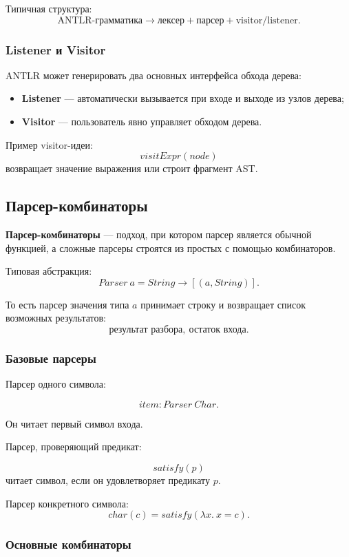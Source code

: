 \documentclass[12pt,a4paper]{article}
\theoremstyle{definition}
\theoremstyle{plain}
\begin{document}
Типичная структура:
\[
\text{ANTLR-грамматика}
\to
\text{лексер}
+
\text{парсер}
+
\text{visitor/listener}.
\]

\subsubsection*{Listener и Visitor}

ANTLR может генерировать два основных интерфейса обхода дерева:

\begin{itemize}
    \item \textbf{Listener} --- автоматически вызывается при входе и выходе из узлов дерева;
    \item \textbf{Visitor} --- пользователь явно управляет обходом дерева.
\end{itemize}

Пример visitor-идеи:
\[
visitExpr(node)
\]
возвращает значение выражения или строит фрагмент AST.

\subsection{Парсер-комбинаторы}

\textbf{Парсер-комбинаторы} --- подход, при котором парсер является обычной функцией, а сложные парсеры строятся из простых с помощью комбинаторов.

Типовая абстракция:
\[
Parser\ a = String \to [(a,String)].
\]

То есть парсер значения типа $a$ принимает строку и возвращает список возможных результатов:
\[
\text{результат разбора},\ \text{остаток входа}.
\]

\subsubsection*{Базовые парсеры}

Парсер одного символа:

\[
item : Parser\ Char.
\]

Он читает первый символ входа.

Парсер, проверяющий предикат:

\[
satisfy(p)
\]
читает символ, если он удовлетворяет предикату $p$.

Парсер конкретного символа:
\[
char(c)=satisfy(\lambda x.\ x=c).
\]

\subsubsection*{Основные комбинаторы}
\end{document}
